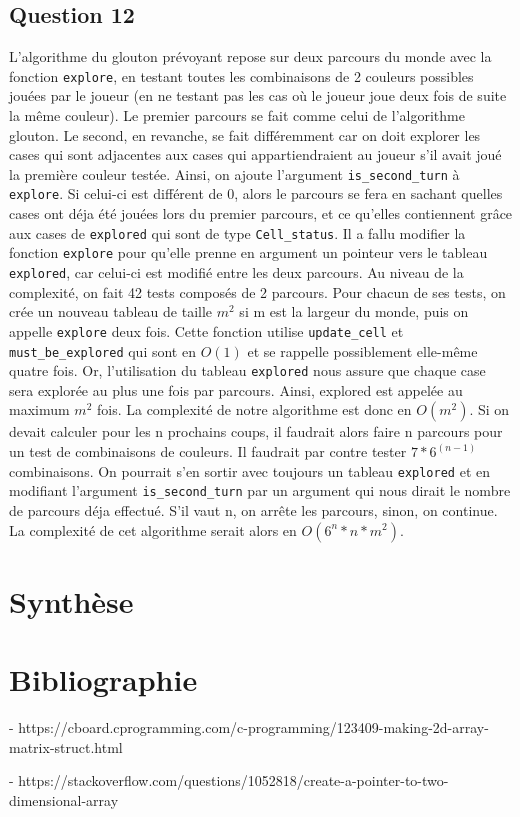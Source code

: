 \documentclass{article}
\begin{document}
\subsection{Question 12}
    L'algorithme du glouton prévoyant repose sur deux parcours du monde avec la fonction \texttt{explore}, en testant toutes les combinaisons de 2 couleurs possibles jouées par le joueur (en ne testant pas les cas où le joueur joue deux fois de suite la même couleur). Le premier parcours se fait comme celui de l'algorithme glouton. Le second, en revanche, se fait différemment car on doit explorer les cases qui sont adjacentes aux cases qui appartiendraient au joueur s'il avait joué la première couleur testée. Ainsi, on ajoute l'argument \texttt{is\_second\_turn} à \texttt{explore}. Si celui-ci est différent de 0, alors le parcours se fera en sachant quelles cases ont déja été jouées lors du premier parcours, et ce qu'elles contiennent grâce aux cases de \texttt{explored} qui sont de type \texttt{Cell\_status}. Il a fallu modifier la fonction \texttt{explore} pour qu'elle prenne en argument un pointeur vers le tableau \texttt{explored}, car celui-ci est modifié entre les deux parcours. Au niveau de la complexité, on fait 42 tests composés de 2 parcours. Pour chacun de ses tests, on crée un nouveau tableau de taille $m^2$ si m est la largeur du monde, puis on appelle \texttt{explore} deux fois. Cette fonction utilise \texttt{update\_cell} et \texttt{must\_be\_explored} qui sont en $O(1)$ et se rappelle possiblement elle-même quatre fois. Or, l'utilisation du tableau \texttt{explored} nous assure que chaque case sera explorée au plus une fois par parcours. Ainsi, explored est appelée au maximum $m^2$ fois. La complexité de notre algorithme est donc en $O(m^2)$. Si on devait calculer pour les n prochains coups, il faudrait alors faire n parcours pour un test de combinaisons de couleurs. Il faudrait par contre tester $7*6^{(n-1)}$ combinaisons. On pourrait s'en sortir avec toujours un tableau \texttt{explored} et en modifiant l'argument \texttt{is\_second\_turn} par un argument qui nous dirait le nombre de parcours déja effectué. S'il vaut n, on arrête les parcours, sinon, on continue. La complexité de cet algorithme serait alors en $O({6^n}*n*m^2)$.
\section{Synthèse}


\section{Bibliographie}

- https://cboard.cprogramming.com/c-programming/123409-making-2d-array-matrix-struct.html

- https://stackoverflow.com/questions/1052818/create-a-pointer-to-two-dimensional-array
\end{document}
